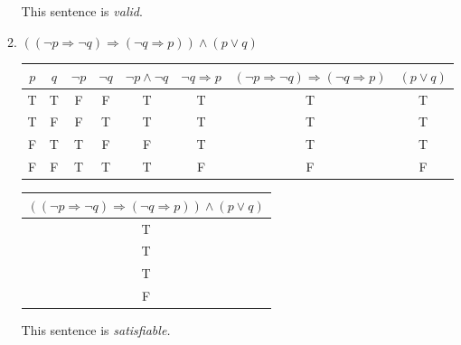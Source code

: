 \documentclass{article}
\begin{document}
\begin{enumerate}
\begin{enumerate}
\begin{tabular}{|c|c|c|c|c|c|c|c|}
					\end{tabular}

					This sentence is \emph{valid}.
			\item $(( \neg p \Rightarrow \neg q) \Rightarrow (\neg q \Rightarrow p)) \wedge (p \vee q)$

				\begin{tabular}{|c|c|c|c|c|c|c|c|}
					\hline
					$p$ & $q$ & $\neg p$ & $ \neg q$ & $ \neg p \wedge \neg q $ & $ \neg q \Rightarrow p $ &
					$( \neg p \Rightarrow \neg q) \Rightarrow (\neg q \Rightarrow p)$ & $(p \vee q)$\\
					\hline
					T & T & F & F & T & T & T & T\\
					\hline
					T & F & F & T & T & T & T & T\\
					\hline
					F & T & T & F & F & T & T & T\\
					\hline
					F & F & T & T & T & F & F & F\\
					\hline
				\end{tabular}

				\begin{tabular}{|c|}
					\hline
					$(( \neg p \Rightarrow \neg q) \Rightarrow (\neg q \Rightarrow p)) \wedge (p \vee q)$ \\
					\hline
					T \\
					\hline
					T \\
					\hline 
					T \\
					\hline
					F \\
					\hline
				\end{tabular}

				This sentence is \emph{satisfiable.}
		\end{enumerate}
\end{enumerate}
\end{document}
